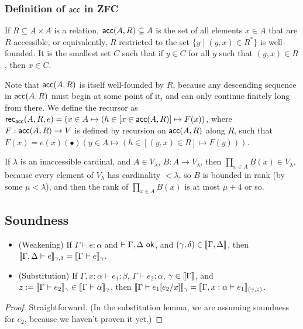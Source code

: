 \subsubsection{Definition of $\mathsf{acc}$ in ZFC}
If $R\subseteq A\times A$ is a relation, $\mathsf{acc}(A,R)\subseteq A$ is the set of all elements $x\in A$ that are $R$-accessible, or equivalently, $R$ restricted to the set $\{y\mid (y,x)\in R^*\}$ is well-founded. It is the smallest set $C$ such that if $y\in C$ for all $y$ such that $(y,x)\in R$, then $x\in C$.

Note that $\mathsf{acc}(A,R)$ is itself well-founded by $R$, because any descending sequence in $\mathsf{acc}(A,R)$ must begin at some point of it, and can only continue finitely long from there. We define the recursor as $\mathsf{rec}_{\mathsf{acc}}(A,R,e)=(x\in A\mapsto (h\in [x\in\mathsf{acc}(A,R)]\mapsto F(x))$, where $F:\mathsf{acc}(A,R)\to V$ is defined by recursion on $\mathsf{acc}(A,R)$ along $R$, such that $F(x)=e(x)(\bullet)(y\in A\mapsto (h\in[(y,x)\in R]\mapsto F(y)))$.

\begin{remark}\label{rem:inacc_dprod}
If $\lambda$ is an inaccessible cardinal, and $A\in V_\lambda$, $B:A\to V_\lambda$, then $\prod_{x\in A} B(x)\in V_\lambda$, because every element of $V_\lambda$ has cardinality $<\lambda$, so $B$ is bounded in rank (by some $\mu<\lambda$), and then the rank of $\prod_{x\in A} B(x)$ is at most $\mu+4$ or so.
\end{remark}

\subsection{Soundness}
\begin{lemma}[Basics]
\begin{itemize}
\item (Weakening) If $\Gamma\vdash e:\alpha$ and $\vdash\Gamma,\Delta\ok$, and $(\gamma,\delta)\in\scott{\Gamma,\Delta}$, then $\scott{\Gamma,\Delta\vdash e}_{\gamma,\delta}=\scott{\Gamma\vdash e}_\gamma$.
\item (Substitution) If $\Gamma,x:\alpha\vdash e_1:\beta$, $\Gamma\vdash e_2:\alpha$, $\gamma\in\scott{\Gamma}$, and $z:=\scott{\Gamma\vdash e_2}_\gamma\in\scott{\Gamma\vdash\alpha}_\gamma$, then $\scott{\Gamma\vdash e_1[e_2/x]}_\gamma=\scott{\Gamma,x:\alpha\vdash e_1}_{(\gamma,z)}$.
\end{itemize}
\end{lemma}
\begin{proof}
Straightforward. (In the substitution lemma, we are assuming soundness for $e_2$, because we haven't proven it yet.)
\end{proof}

